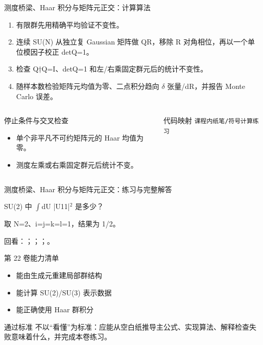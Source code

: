 \begin{frame}[t]{测度桥梁、Haar 积分与矩阵元正交：计算算法}
\footnotesize
{}\begin{enumerate}
\item 有限群先用精确平均验证不变性。
\item 连续 SU(N) 从独立复 Gaussian 矩阵做 QR，移除 R 对角相位，再以一个单位模因子校正 detQ=1。
\item 检查 Q†Q=I、detQ=1 和左/\allowbreak{}右乘固定群元后的统计不变性。
\item 随样本数检验矩阵元均值为零、二点积分趋向 \ensuremath{\delta} 张量/\allowbreak{}dR，并报告 Monte Carlo 误差。
\end{enumerate}\begin{columns}[T,onlytextwidth]
\begin{block}{停止条件与交叉检查}\scriptsize\begin{itemize}
\item[\CheckMark] 单个非平凡不可约矩阵元的 Haar 均值为零。
\item[\CheckMark] 测度左乘或右乘固定群元后统计不变。
\end{itemize}\end{block}
\begin{block}{代码映射}
\scriptsize \texttt{课程内纸笔/\allowbreak{}符号计算练习}
\end{block}\end{columns}\end{frame}

\begin{frame}[t]{测度桥梁、Haar 积分与矩阵元正交：练习与完整解答}
\footnotesize
\begin{block}{}SU(2) 中 \ensuremath{\int}dU |U11|\ensuremath{^{2}} 是多少？\end{block}
\begin{exampleblock}{}取 N=2、i=j=k=l=1，结果为 1/\allowbreak{}2。\end{exampleblock}
\vfill
\scriptsize 回看：；；；。
\end{frame}

\begin{frame}[t]{第 22 卷能力清单}
\small\begin{itemize}
\item[\CheckMark] 能由生成元重建局部群结构
\item[\CheckMark] 能计算 SU(2)/\allowbreak{}SU(3) 表示数据
\item[\CheckMark] 能正确使用 Haar 群积分
\end{itemize}\vfill\begin{block}{通过标准}
不以“看懂”为标准：应能从空白纸推导主公式、实现算法、解释检查失败意味着什么，并完成本卷练习。
\end{block}\end{frame}

